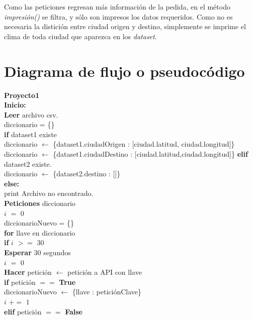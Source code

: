 \documentclass[]{article}
\begin{document}
Como las peticiones regresan más información de la pedida, en el método
\emph{impresión()} se filtra, y sólo son impresos los datos requeridos. Como 
no es necesaria la distición entre ciudad origen y destino, simplemente se 
imprime el clima de toda ciudad que aparezca en los \emph{dataset}.

\section{Diagrama de flujo o pseudocódigo}
\textbf{Proyecto1}\\
\textbf{Inicio:}\\
\indent \textbf{Leer} archivo csv.\\
\indent\indent diccionario = \{\}\\
\indent\indent \textbf{if} dataset1 existe\\
\indent\indent\indent diccionario $ \leftarrow $ \{dataset1.ciudadOrigen : [ciudad.latitud, ciudad.longitud]\} \\
\indent\indent\indent diccionario $ \leftarrow $ \{dataset1.ciudadDestino : [ciudad.latitud,ciudad.longitud]\}
\indent\indent \textbf{elif} dataset2 existe.\\
\indent\indent\indent diccionario $ \leftarrow $ \{dataset2.destino : []\}\\
\indent\indent \textbf{else:}\\
\indent\indent\indent print Archivo no encontrado.\\
\indent \textbf{Peticiones} diccionario\\
\indent\indent $ i $ $ = $ $ 0 $\\
\indent\indent diccionarioNuevo = \{\} \\
\indent\indent \textbf{for} llave en diccionario\\
\indent\indent\indent \textbf{if} $ i $ $ >= $ $ 30 $\\
\indent\indent\indent\indent \textbf{Esperar} 30 segundos\\
\indent\indent\indent\indent $ i $ $ = $ $ 0 $\\
\indent\indent\indent \textbf{Hacer} petición $ \leftarrow $ petición a API con llave\\
\indent\indent\indent \textbf{if} petición $ == $ \textbf{True}\\
\indent\indent\indent\indent diccionarioNuevo $ \leftarrow $ \{llave : peticiónClave\}\\
\indent\indent\indent\indent $ i $ $ += $ $ 1 $\\
\indent\indent\indent \textbf{elif} petición $ == $ \textbf{False}\\
\end{document}
